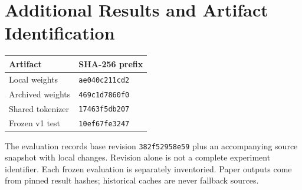 \documentclass[11pt]{article}
\begin{document}

\clearpage
\onecolumn
\appendix
\section{Additional Results and Artifact Identification}
\noindent\begin{minipage}[t]{.45\textwidth}
\centering\small
{}
\end{minipage}\hfill
\begin{minipage}[t]{.51\textwidth}
\centering\small\resizebox{\linewidth}{!}{}
\label{tab:paired}
\end{minipage}
\par\bigskip
\noindent\begin{minipage}[t]{.49\textwidth}
\centering\small\resizebox{\linewidth}{!}{}
\end{minipage}\hfill
\begin{minipage}[t]{.47\textwidth}
\centering\small\resizebox{\linewidth}{!}{}
\label{tab:pilot}
\medskip
\begin{tabular}{ll}\toprule
Artifact & SHA-256 prefix \\\midrule
Local weights & \texttt{ae040c211cd2} \\
Archived weights & \texttt{469c1d7860f0} \\
Shared tokenizer & \texttt{17463f5db207} \\
Frozen v1 test & \texttt{10ef67fe3247} \\\bottomrule
\end{tabular}
\label{tab:hashes}
\medskip\raggedright
The evaluation records base revision \texttt{382f52958e59} plus an accompanying
source snapshot with local changes. Revision alone is not a complete experiment
identifier. Each frozen evaluation is separately inventoried. Paper outputs
come from pinned result hashes; historical caches are never fallback sources.
\end{minipage}
\par\bigskip
\begin{center}
\small\resizebox{\textwidth}{!}{}
\end{center}
\end{document}
